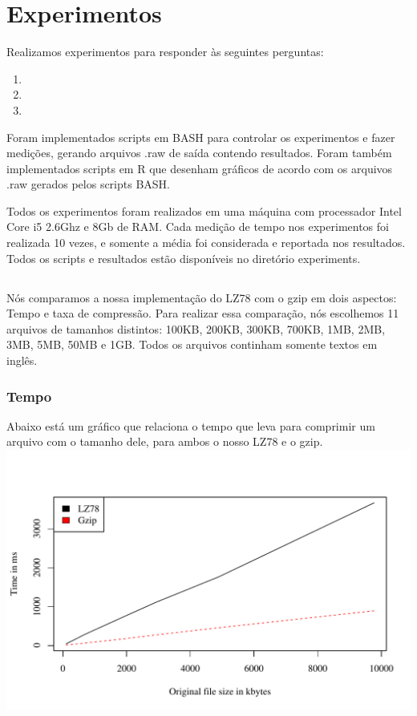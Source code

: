 \section{Experimentos}
Realizamos experimentos para responder às seguintes perguntas:
\begin{enumerate}
\item \rqone
\item \rqtwo
\item \rqthree
\end{enumerate}

Foram implementados scripts em BASH para controlar os experimentos e fazer
medições, gerando arquivos .raw de saída contendo resultados. Foram também
implementados scripts em R que desenham gráficos de acordo com os arquivos .raw
gerados pelos scripts BASH.


Todos os experimentos foram realizados em uma máquina com processador Intel Core
i5 2.6Ghz e 8Gb de RAM. Cada medição de tempo nos experimentos foi realizada 10
vezes, e somente a média foi considerada e reportada nos resultados.
Todos os scripts e resultados estão disponíveis no diretório experiments.

\subsection{\rqone}
Nós comparamos a nossa implementação do LZ78 com o gzip em dois aspectos: Tempo
e taxa de compressão.
Para realizar essa comparação, nós escolhemos 11 arquivos de tamanhos distintos:
100KB, 200KB, 300KB, 700KB, 1MB, 2MB, 3MB, 5MB, 50MB e 1GB.
Todos os arquivos continham somente textos em inglês.

\subsubsection{Tempo}

Abaixo está um gráfico que relaciona o tempo que leva para comprimir um arquivo
com o tamanho dele, para ambos o nosso LZ78 e o gzip.
\\
\includegraphics[scale=0.74]{../experiments/R/pdf/time_comp}
\\

